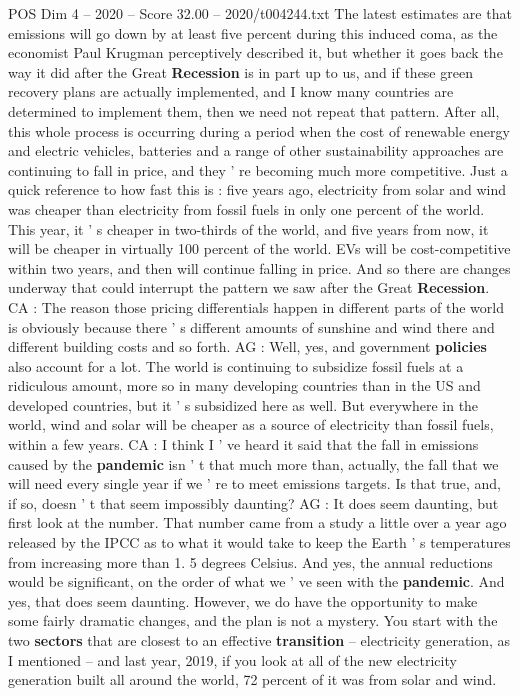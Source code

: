\begin{textsample}{POS Dim 4 – 2020 – Score 32.00 – 2020/t004244.txt}
The latest estimates are that emissions will go down by at least five percent during this induced coma, as the economist Paul Krugman perceptively described it, but whether it goes back the way it did after the Great \textbf{Recession} is in part up to us, and if these green recovery plans are actually implemented, and I know many countries are determined to implement them, then we need not repeat that pattern.
After all, this whole process is occurring during a period when the cost of renewable energy and electric vehicles, batteries and a range of other sustainability approaches are continuing to fall in price, and they ' re becoming much more competitive.
Just a quick reference to how fast this is : five years ago, electricity from solar and wind was cheaper than electricity from fossil fuels in only one percent of the world.
This year, it ' s cheaper in two-thirds of the world, and five years from now, it will be cheaper in virtually 100 percent of the world.
EVs will be cost-competitive within two years, and then will continue falling in price.
And so there are changes underway that could interrupt the pattern we saw after the Great \textbf{Recession}.
CA : The reason those pricing differentials happen in different parts of the world is obviously because there ' s different amounts of sunshine and wind there and different building costs and so forth.
AG : Well, yes, and government \textbf{policies} also account for a lot.
The world is continuing to subsidize fossil fuels at a ridiculous amount, more so in many developing countries than in the US and developed countries, but it ' s subsidized here as well.
But everywhere in the world, wind and solar will be cheaper as a source of electricity than fossil fuels, within a few years.
CA : I think I ' ve heard it said that the fall in emissions caused by the \textbf{pandemic} isn ' t that much more than, actually, the fall that we will need every single year if we ' re to meet emissions targets.
Is that true, and, if so, doesn ' t that seem impossibly daunting?
AG : It does seem daunting, but first look at the number.
That number came from a study a little over a year ago released by the IPCC as to what it would take to keep the Earth ' s temperatures from increasing more than 1. 5 degrees Celsius.
And yes, the annual reductions would be significant, on the order of what we ' ve seen with the \textbf{pandemic}.
And yes, that does seem daunting.
However, we do have the opportunity to make some fairly dramatic changes, and the plan is not a mystery.
You start with the two \textbf{sectors} that are closest to an effective \textbf{transition} -- electricity generation, as I mentioned -- and last year, 2019, if you look at all of the new electricity generation built all around the world, 72 percent of it was from solar and wind.

\end{textsample}
